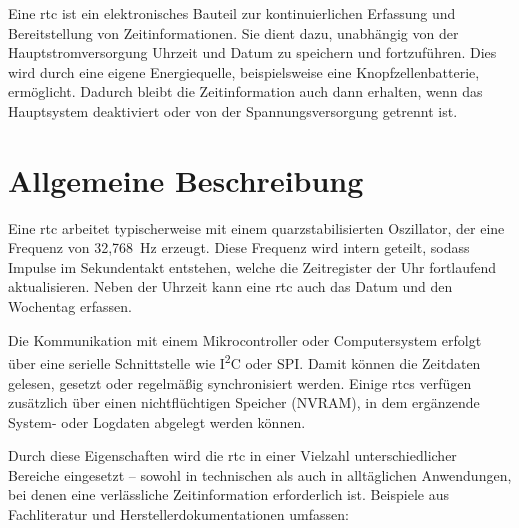Eine \ac{rtc} ist ein elektronisches Bauteil zur kontinuierlichen Erfassung und Bereitstellung von Zeitinformationen. 
Sie dient dazu, unabhängig von der Hauptstromversorgung Uhrzeit und Datum zu speichern und fortzuführen. 
Dies wird durch eine eigene Energiequelle, beispielsweise eine Knopfzellenbatterie, ermöglicht. 
Dadurch bleibt die Zeitinformation auch dann erhalten, wenn das Hauptsystem deaktiviert oder von der Spannungsversorgung getrennt ist.
\cite{Mueller:2023b,seeedstudio:2020}

\section{Allgemeine Beschreibung}

Eine \ac{rtc} arbeitet typischerweise mit einem quarzstabilisierten Oszillator, der eine Frequenz von 32{,}768~Hz erzeugt. 
Diese Frequenz wird intern geteilt, sodass Impulse im Sekundentakt entstehen, welche die Zeitregister der Uhr fortlaufend aktualisieren. 
Neben der Uhrzeit kann eine \ac{rtc} auch das Datum und den Wochentag erfassen. 
\cite{Mueller:2023b,seeedstudio:2025}

Die Kommunikation mit einem Mikrocontroller oder Computersystem erfolgt über eine serielle Schnittstelle 
wie I\textsuperscript{2}C oder SPI. 
Damit können die Zeitdaten gelesen, gesetzt oder regelmäßig synchronisiert werden. 
Einige \acp{rtc} verfügen zusätzlich über einen nichtflüchtigen Speicher (NVRAM), in dem ergänzende System- oder Logdaten abgelegt werden können.
\cite{seeedstudio:2020b}

\medskip
\noindent
Durch diese Eigenschaften wird die \ac{rtc} in einer Vielzahl unterschiedlicher Bereiche eingesetzt – sowohl in technischen als auch in alltäglichen Anwendungen, bei denen eine verlässliche Zeitinformation erforderlich ist. 
Beispiele aus Fachliteratur und Herstellerdokumentationen umfassen:

